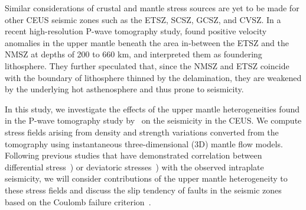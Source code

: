 \documentclass[draft,linenumbers]{agujournal2018}
\begin{document}
Similar considerations of crustal and mantle stress sources are yet to be made for other CEUS seismic zones such as the ETSZ, SCSZ, GCSZ, and CVSZ. In a recent high-resolution P-wave tomography study, \citet{Biryol_2016} found positive velocity anomalies in the upper mantle beneath the area in-between the ETSZ and the NMSZ at depths of 200 to 660 km, and interpreted them as foundering lithosphere. They further speculated that, since the NMSZ and ETSZ coincide with the boundary of lithosphere thinned by the delamination, they are weakened by the underlying hot asthenosphere and thus prone to seismicity. 

In this study, we investigate the effects of the upper mantle heterogeneities found in the P-wave tomography study by~\citet{Biryol_2016} on the seismicity in the CEUS. We compute stress fields arising from density and strength variations converted from the tomography using instantaneous three-dimensional (3D) mantle flow models. %
Following previous studies that have demonstrated correlation between differential stress~\citep[e.g.,][]{baird2010relationship, zhan2016stress}) or deviatoric stresses~\citep[e.g.,][]{levandowski2016dense}) with the observed intraplate seismicity, 
we will consider contributions of the upper mantle heterogeneity to these stress fields and discuss the slip tendency of faults in the seismic zones based on the Coulomb failure criterion~\citep[e.g.,][]{king1994static, freed2005earthquake, li2007stress}. 
\end{document}
